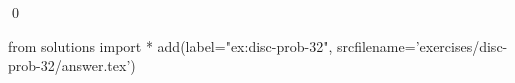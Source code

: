 
\begin{ex} 
  \label{ex:disc-prob-32}
  
  \qed
\end{ex} 
\begin{python0}
from solutions import *
add(label="ex:disc-prob-32",
    srcfilename='exercises/disc-prob-32/answer.tex') 
\end{python0}
